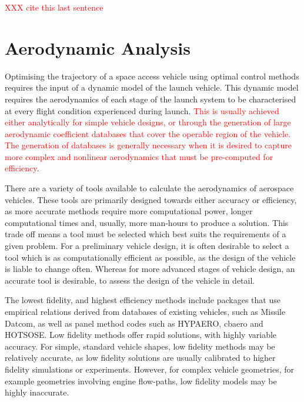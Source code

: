 \textcolor{red}{XXX cite this last sentence}















 







\section{Aerodynamic Analysis}

Optimising the trajectory of a space access vehicle using optimal control methods requires the input of a dynamic model of the launch vehicle. 
This dynamic model requires the aerodynamics of each stage of the launch system to be characterised at every flight condition experienced during launch. \textcolor{red}{This is usually achieved either analytically for simple vehicle designs, or through the generation of large aerodynamic coefficient databases that cover the operable region of the vehicle. The generation of databases is generally necessary when it is desired to capture more complex and nonlinear aerodynamics that must be pre-computed for efficiency.}

There are a variety of tools available to calculate the aerodynamics of aerospace vehicles.
 These tools are primarily designed towards either accuracy or efficiency, as more accurate methods require more computational power, longer computational times and, usually, more man-hours to produce a solution. 
This trade off means a tool must be selected which best suits the requirements of a given problem. 
For a preliminary vehicle design, it is often desirable to select a tool which is as computationally efficient as possible, as the design of the vehicle is liable to change often. 
Whereas for more advanced stages of vehicle design, an accurate tool is desirable, to assess the design of the vehicle in detail. 

The lowest fidelity, and highest efficiency methods include packages that use empirical relations derived from databases of existing vehicles, such as Missile Datcom\cite{Rosema2011}, as well as panel method codes such as HYPAERO\cite{Preller2017b}, cbaero\cite{Kinney2004} and HOTSOSE\cite{hotsose}. Low fidelity methods offer rapid solutions, with highly variable accuracy. For simple, standard vehicle shapes, low fidelity methods may be relatively accurate, as low fidelity solutions are usually calibrated to higher fidelity simulations or experiments. However, for complex vehicle geometries, for example geometries involving engine flow-paths, low fidelity models may be highly inaccurate\cite{Krause2011}. 

